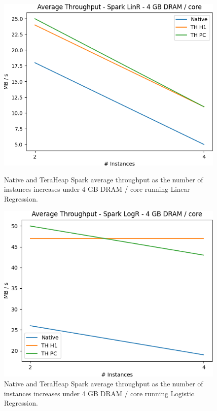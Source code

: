 \begin{figure}[thbp]
        \centering
        \includegraphics[width=\linewidth]{./fig/LINR_64_THR.png}
    \caption{Native and TeraHeap Spark average throughput
        as the number of instances increases under 4 GB DRAM / core running Linear Regression.}
                \label{fig:linr_64_thr}
        \includegraphics[width=\linewidth]{./fig/LOGR_64_THR.png}
    \caption{Native and TeraHeap Spark average throughput
        as the number of instances increases under 4 GB DRAM / core running Logistic Regression.}
                \label{fig:logr_64_thr}
\end{figure}

